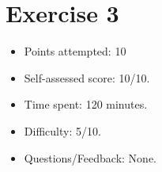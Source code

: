 \documentclass[12pt]{article}
\begin{document}
\section*{Exercise 3}
\begin{itemize}
  \item Points attempted: 10
  \item Self-assessed score: 10/10.
  \item Time spent: 120 minutes.
  \item Difficulty: 5/10.
  \item Questions/Feedback: None.
\end{itemize}

\end{document}
